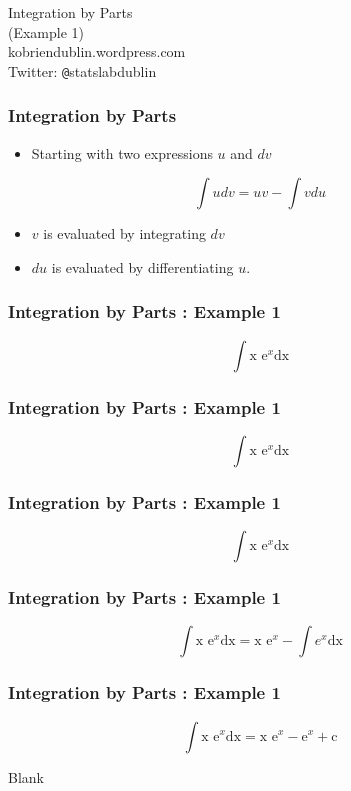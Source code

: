 \documentclass{beamer}
\begin{document}
\begin{frame}
\begin{center}
\Huge
Integration by Parts\\
\LARGE
(Example 1)\\
\bigskip
kobriendublin.wordpress.com\\
Twitter: \texttt{@}statslabdublin


\end{center}
\end{frame}

\begin{frame}
\frametitle{Integration by Parts}
\LARGE
\begin{itemize}
\item Starting with two expressions $u$ and $dv$
\end{itemize}

\[\int u dv = uv - \int vdu \]
\begin{itemize}
\item $v$ is evaluated by integrating $dv$
\item $du$ is evaluated by differentiating $u$.
\end{itemize}
\end{frame}


\begin{frame}
\frametitle{Integration by Parts :  Example 1}
\Huge
\vspace{-3cm}
\[\int \mbox{x e}^x\mbox{dx}\]

 
\end{frame}
\begin{frame}
\frametitle{Integration by Parts :  Example 1}
\Huge
\vspace{-3cm}
\[\int \mbox{x e}^x\mbox{dx}\]

 

\end{frame}
\begin{frame}
\frametitle{Integration by Parts :  Example 1}
\Huge
\vspace{-3cm}
\[\int \mbox{x e}^x\mbox{dx}\]

 

\end{frame}
\begin{frame}
\frametitle{Integration by Parts :  Example 1}
\Huge
\vspace{-3cm}
\[\int \mbox{x e}^x\mbox{dx} = \mbox{x e}^x - \int e^x\mbox{dx} \]

 
\end{frame}
\begin{frame}
\frametitle{Integration by Parts :  Example 1}
\Huge
\vspace{-3cm}
\[\int \mbox{x e}^x\mbox{dx} = \mbox{x e}^x - \mbox{e}^x  + \mbox{c}\]

 
\end{frame}
\begin{frame}
Blank
\end{frame}
\end{document}
